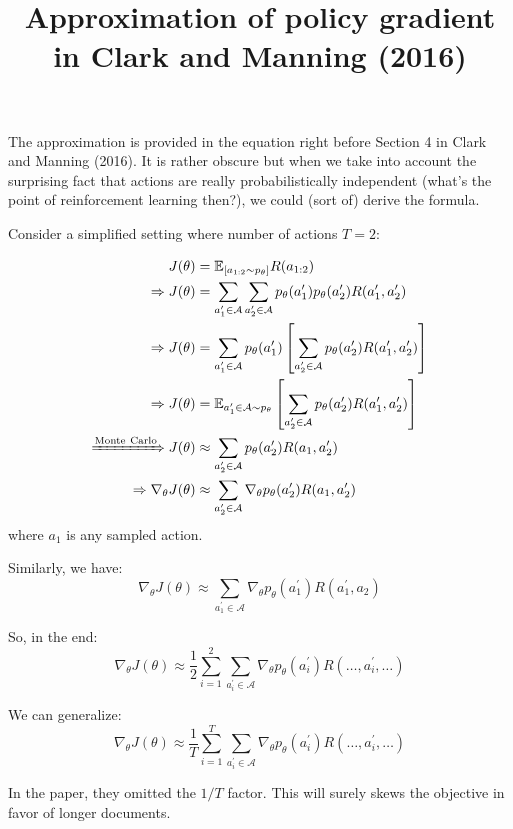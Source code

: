 \documentclass{article}
\title{Approximation of policy gradient in Clark and Manning (2016)}
\begin{document}
The approximation is provided in the equation right before Section 4 in Clark and Manning (2016)\cite{Clark2016a}. It is rather obscure but when we take into account the surprising fact that actions are really probabilistically independent (what's the point of reinforcement learning then?), we could (sort of) derive the formula.

Consider a simplified setting where number of actions $T=2$:

\begin{equation}
\begin{split}
J(\theta) &= \mathbb{E}_{[a_{1:2}  \sim p_\theta]} R(a_{1:2}) \\
\Rightarrow J(\theta) &= \sum_{a^\prime_1 \in \mathcal{A}} \sum_{a^\prime_2 \in \mathcal{A}} p_\theta(a^\prime_1)p_\theta(a^\prime_2) R(a^\prime_1, a^\prime_2) \\
\Rightarrow J(\theta) &= \sum_{a^\prime_1 \in \mathcal{A}}  p_\theta(a^\prime_1) \left[ \sum_{a^\prime_2 \in \mathcal{A}} p_\theta(a^\prime_2) R(a^\prime_1, a^\prime_2) \right] \\
\Rightarrow J(\theta) &= \mathbb{E}_{a^\prime_1 \in \mathcal{A} \sim p_\theta}  \left[ \sum_{a^\prime_2 \in \mathcal{A}} p_\theta(a^\prime_2) R(a^\prime_1, a^\prime_2) \right] \\
\xRightarrow{\mathrm{Monte\ Carlo}} J(\theta) &\approx \sum_{a^\prime_2 \in \mathcal{A}} p_\theta(a^\prime_2) R(a_1, a^\prime_2) \\
\Rightarrow \nabla_\theta J(\theta) &\approx \sum_{a^\prime_2 \in \mathcal{A}} \nabla_\theta p_\theta(a^\prime_2) R(a_1, a^\prime_2) 
\end{split}
\end{equation}
where $a_1$ is any sampled action.

Similarly, we have: 
\begin{equation}
\nabla_\theta J(\theta) \approx \sum_{a^\prime_1 \in \mathcal{A}} \nabla_\theta p_\theta(a^\prime_1) R(a^\prime_1, a_2)
\end{equation}

So, in the end: 
\begin{equation}
\nabla_\theta J(\theta) \approx \frac{1}{2} \sum_{i=1}^2 \sum_{a^\prime_i \in \mathcal{A}} \nabla_\theta p_\theta(a^\prime_i) R(\dots, a^\prime_i, \dots)
\end{equation}

We can generalize:
\begin{equation}
\nabla_\theta J(\theta) \approx \frac{1}{T} \sum_{i=1}^T \sum_{a^\prime_i \in \mathcal{A}} \nabla_\theta p_\theta(a^\prime_i) R(\dots, a^\prime_i, \dots)
\end{equation}

In the paper, they omitted the $1/T$ factor. This will surely skews the objective in favor of longer documents.



\end{document}
